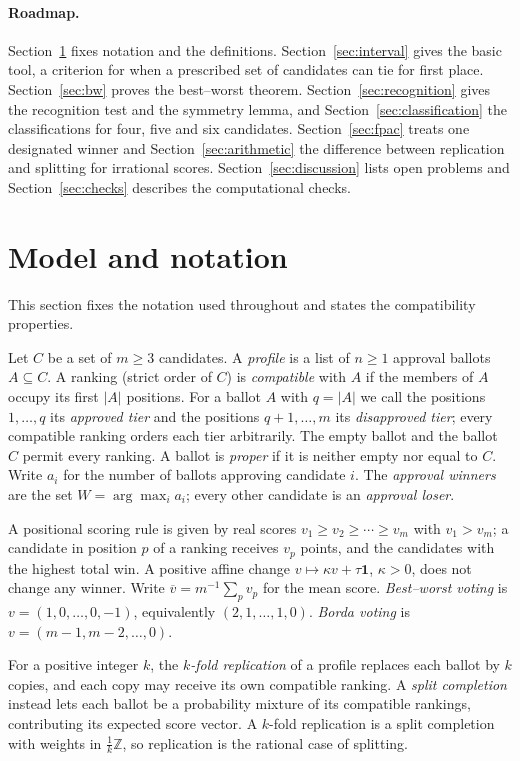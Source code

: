 \documentclass[11pt,a4paper]{article}
\theoremstyle{definition}
\theoremstyle{remark}
\newcommand{\one}{\mathbf 1}
\begin{document}
\paragraph{Roadmap.} Section~\ref{sec:model} fixes notation and the definitions. Section~\ref{sec:interval} gives the basic tool, a criterion for when a prescribed set of candidates can tie for first place. Section~\ref{sec:bw} proves the best--worst theorem. Section~\ref{sec:recognition} gives the recognition test and the symmetry lemma, and Section~\ref{sec:classification} the classifications for four, five and six candidates. Section~\ref{sec:fpac} treats one designated winner and Section~\ref{sec:arithmetic} the difference between replication and splitting for irrational scores. Section~\ref{sec:discussion} lists open problems and Section~\ref{sec:checks} describes the computational checks.

\section{Model and notation}\label{sec:model}
This section fixes the notation used throughout and states the compatibility properties.

Let $C$ be a set of $m\ge3$ candidates. A \emph{profile} is a list of $n\ge1$ approval ballots $A\subseteq C$. A ranking (strict order of $C$) is \emph{compatible} with $A$ if the members of $A$ occupy its first $|A|$ positions. For a ballot $A$ with $q=|A|$ we call the positions $1,\ldots,q$ its \emph{approved tier} and the positions $q+1,\ldots,m$ its \emph{disapproved tier}; every compatible ranking orders each tier arbitrarily. The empty ballot and the ballot $C$ permit every ranking. A ballot is \emph{proper} if it is neither empty nor equal to $C$. Write $a_i$ for the number of ballots approving candidate $i$. The \emph{approval winners} are the set $W=\arg\max_i a_i$; every other candidate is an \emph{approval loser}.

A positional scoring rule is given by real scores $v_1\ge v_2\ge\cdots\ge v_m$ with $v_1>v_m$; a candidate in position $p$ of a ranking receives $v_p$ points, and the candidates with the highest total win. A positive affine change $v\mapsto\kappa v+\tau\one$, $\kappa>0$, does not change any winner. Write $\overline v=m^{-1}\sum_p v_p$ for the mean score. \emph{Best--worst voting} is $v=(1,0,\ldots,0,-1)$, equivalently $(2,1,\ldots,1,0)$. \emph{Borda voting} is $v=(m-1,m-2,\ldots,0)$.

For a positive integer $k$, the \emph{$k$-fold replication} of a profile replaces each ballot by $k$ copies, and each copy may receive its own compatible ranking. A \emph{split completion} instead lets each ballot be a probability mixture of its compatible rankings, contributing its expected score vector. A $k$-fold replication is a split completion with weights in $\frac1k\mathbb Z$, so replication is the rational case of splitting.
\end{document}
